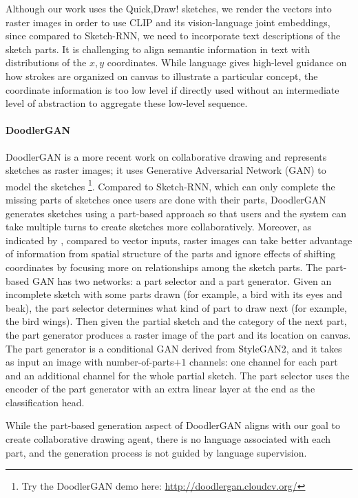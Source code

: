 Although our work uses the Quick,Draw! sketches, we render the vectors into raster images in order to use CLIP and its vision-language joint embeddings, since compared to Sketch-RNN, we need to incorporate text descriptions of the sketch parts.
It is challenging to align semantic information in text with distributions of the $x,y$ coordinates. While language gives high-level guidance on how strokes are organized on canvas to illustrate a particular concept, the coordinate information is too low level if directly used without an intermediate level of abstraction to aggregate these low-level sequence.    

\paragraph{DoodlerGAN} 
DoodlerGAN \citep{doodlerGAN} is a more recent work on collaborative drawing and represents sketches as raster images; it uses Generative Adversarial Network (GAN) to model the sketches \footnote{Try the DoodlerGAN demo here: \url{http://doodlergan.cloudcv.org/}}. Compared to Sketch-RNN, which can only complete the missing parts of sketches once users are done with their parts, DoodlerGAN generates sketches using a part-based approach so that users and the system can take multiple turns to create sketches more collaboratively. 
Moreover, as indicated by \cite{doodlerGAN}, compared to vector inputs, raster images can take better advantage of information from spatial structure of the parts and ignore effects of shifting coordinates by focusing more on relationships among the sketch parts.   
The part-based GAN has two networks: a part selector and a part generator. Given an incomplete sketch with some parts drawn (for example, a bird with its eyes and beak), the part selector determines what kind of part to draw next (for example, the bird wings). Then given the partial sketch and the category of the next part, the part generator produces a raster image of the part and its location on canvas. 
The part generator is a conditional GAN derived from StyleGAN2, and it takes as input an image with number-of-parts$+1$ channels: one channel for each part and an additional channel for the whole partial sketch. The part selector uses the encoder of the part generator with an extra linear layer at the end as the classification head. 

While the part-based generation aspect of DoodlerGAN aligns with our goal to create collaborative drawing agent, there is no language associated with each part, and the generation process is not guided by language supervision.  

